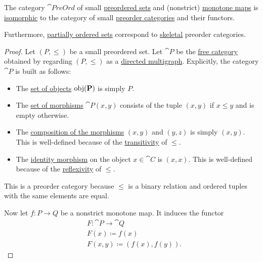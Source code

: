 \begin{theorem}\label{thm:order_category_isomorphism}
  The category \( \cat{PreOrd} \) of small \hyperref[def:preordered_set]{preordered sets} and (nonstrict) \hyperref[def:preordered_set/homomorphism]{monotone maps} is \hyperref[rem:category_similarity/isomorphism]{isomorphic} to the category of small \hyperref[def:preorder_category]{preorder categories} and their functors.

  Furthermore, \hyperref[def:partially_ordered_set]{partially ordered sets} correspond to \hyperref[def:skeletal_category]{skeletal} preorder categories.
\end{theorem}
\begin{proof}
   Let \( (P, \leq) \) be a small preordered set. Let \( \cat{P} \) be the \hyperref[def:directed_multigraph_free_category]{free category} obtained by regarding \( (P, \leq) \) as a \hyperref[def:directed_multigraph]{directed multigraph}. Explicitly, the category \( \cat{P} \) is built as follows:
  \begin{itemize}
    \item The \hyperref[def:category/objects]{set of objects} \( \operatorname{obj}(\operatorname{\mathbf{P}}) \) is simply \( P \).

    \item The \hyperref[def:category/morphisms]{set of morphisms} \( \cat{P}(x, y) \) consists of the tuple \( (x, y) \) if \( x \leq y \) and is empty otherwise.

    \item The \hyperref[def:category/composition]{composition of the morphisms} \( (x, y) \) and \( (y, z) \) is simply \( (x, y) \). This is well-defined because of the \hyperref[def:binary_relation/transitive]{transitivity} of \( \leq \).

    \item The \hyperref[def:category/identity]{identity morphism} on the object \( x \in \cat{C} \) is \( (x, x) \). This is well-defined because of the \hyperref[def:binary_relation/reflexive]{reflexivity} of \( \leq \).
  \end{itemize}

  This is a preorder category because \( \leq \) is a binary relation and ordered tuples with the same elements are equal.

  Now let \( f: P \to Q \) be a nonstrict monotone map. It induces the functor
  \begin{equation*}
    \begin{aligned}
      &F: \cat{P} \to \cat{Q} \\
      &F(x) \coloneqq f(x) \\
      &F(x, y) \coloneqq (f(x), f(y)).
    \end{aligned}
  \end{equation*}


\end{proof}
